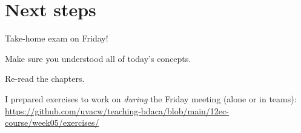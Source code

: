 
\section{Next steps}

\begin{frame}[standout]
Take-home exam on Friday!
\end{frame}


\begin{frame}[standout]
Make sure you understood all of today's concepts.

Re-read the chapters.

I prepared exercises to work on \emph{during} the Friday meeting (alone or in teams):
\large{\url{https://github.com/uvacw/teaching-bdaca/blob/main/12ec-course/week05/exercises/}}
\end{frame}





\begin{frame}
	\printbibliography
\end{frame}




